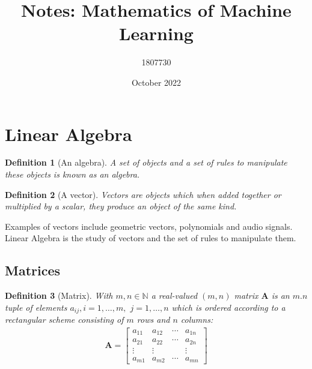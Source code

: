 \documentclass{article}
\title{Notes: Mathematics of Machine Learning}
\author{1807730}
\date{October 2022}
\newtheorem{definition}{Definition}[section]
\begin{document}
	
	\maketitle
	\newpage
	
	\section{Linear Algebra}
	\begin{definition}[An algebra]
		\normalfont A set of objects and a set of rules to manipulate these objects is known as an algebra. 
	\end{definition}
	\begin{definition}[A vector]
		\normalfont Vectors are objects which when added together or multiplied by a scalar, they produce an object of the same kind.
	\end{definition}
	\normalfont Examples of vectors include geometric vectors, polynomials and audio signals. Linear Algebra is the study of vectors and the set of rules to manipulate them. 
	\subsection{Matrices}
	\begin{definition}[Matrix]
		\normalfont With $m, n \in \mathbb{N}$ a real-valued $(m, n)$ matrix $\textbf{A}$ is an $m.n$ tuple of elements $a_{ij}, i = 1, \ldots,m,$ $j = 1, \ldots, n$ which is ordered according to a rectangular scheme consisting of $m$ rows and $n$ columns: 
		\begin{align}
			\textbf{A} = \begin{bmatrix}
				a_{11} & a_{12} & \cdots & a_{1n} \\ 
				a_{21} & a_{22} & \cdots & a_{2n} \\
				\vdots & \vdots & & \vdots \\
				a_{m1} & a_{m2} & \cdots & a_{mn}
			\end{bmatrix}
		\end{align}
	\end{definition}
\end{document}

